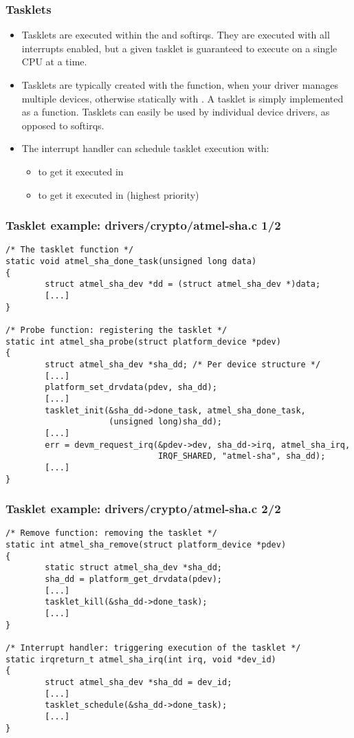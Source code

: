 \begin{frame}
  \frametitle{Tasklets}
  \begin{itemize}
  \item Tasklets are executed within the  and
     softirqs. They are executed with all interrupts enabled, but a
    given tasklet is guaranteed to execute on a single CPU at a time.
  \item Tasklets are typically created with the 
    function, when your driver manages multiple devices, otherwise
    statically with . A tasklet is simply
    implemented as a function. Tasklets can easily
    be used by individual device drivers, as opposed to softirqs.
  \item The interrupt handler can schedule tasklet execution with:
    \begin{itemize}
    \item {} to get it executed in
    \item {} to get it executed in
       (highest priority)
    \end{itemize}
  \end{itemize}
\end{frame}

\begin{frame}[fragile]
  \frametitle{Tasklet example: drivers/crypto/atmel-sha.c 1/2}
\begin{verbatim}
/* The tasklet function */
static void atmel_sha_done_task(unsigned long data)
{
        struct atmel_sha_dev *dd = (struct atmel_sha_dev *)data;
        [...]
}

/* Probe function: registering the tasklet */
static int atmel_sha_probe(struct platform_device *pdev)
{
        struct atmel_sha_dev *sha_dd; /* Per device structure */
        [...]
        platform_set_drvdata(pdev, sha_dd);
        [...]
        tasklet_init(&sha_dd->done_task, atmel_sha_done_task,
                     (unsigned long)sha_dd);
        [...]
        err = devm_request_irq(&pdev->dev, sha_dd->irq, atmel_sha_irq,
                               IRQF_SHARED, "atmel-sha", sha_dd);
        [...]
}
\end{verbatim}
\end{frame}

\begin{frame}[fragile]
  \frametitle{Tasklet example: drivers/crypto/atmel-sha.c 2/2}
\begin{verbatim}
/* Remove function: removing the tasklet */
static int atmel_sha_remove(struct platform_device *pdev)
{
        static struct atmel_sha_dev *sha_dd;
        sha_dd = platform_get_drvdata(pdev);
        [...]
        tasklet_kill(&sha_dd->done_task);
        [...]
}

/* Interrupt handler: triggering execution of the tasklet */
static irqreturn_t atmel_sha_irq(int irq, void *dev_id)
{
        struct atmel_sha_dev *sha_dd = dev_id;
        [...]
        tasklet_schedule(&sha_dd->done_task);
        [...]
}
\end{verbatim}
\end{frame}

